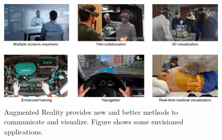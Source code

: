 \begin{figure}[h!]
\centering
\includegraphics[width=\columnwidth]{images/other/motivation}
\caption[Motivation for Augmented Reality]{Augmented Reality provides new and better methods to communicate and visualize. Figure shows some envisioned applications.}
\label{fig:motivation}
\end{figure}

